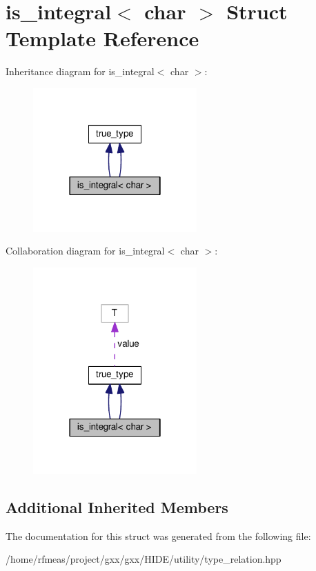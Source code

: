 \hypertarget{structis__integral_3_01char_01_4}{}\section{is\+\_\+integral$<$ char $>$ Struct Template Reference}
\label{structis__integral_3_01char_01_4}


Inheritance diagram for is\+\_\+integral$<$ char $>$\+:
\nopagebreak
\begin{figure}[H]
\begin{center}
\leavevmode
\includegraphics[width=178pt]{structis__integral_3_01char_01_4__inherit__graph}
\end{center}
\end{figure}


Collaboration diagram for is\+\_\+integral$<$ char $>$\+:
\nopagebreak
\begin{figure}[H]
\begin{center}
\leavevmode
\includegraphics[width=178pt]{structis__integral_3_01char_01_4__coll__graph}
\end{center}
\end{figure}
\subsection*{Additional Inherited Members}


The documentation for this struct was generated from the following file\+:\begin{DoxyCompactItemize}
\item 
/home/rfmeas/project/gxx/gxx/\+H\+I\+D\+E/utility/type\+\_\+relation.\+hpp\end{DoxyCompactItemize}
